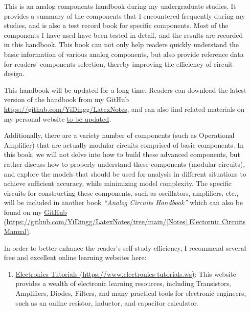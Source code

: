 \documentclass[UTF8]{report}
\begin{document}
\newpage
\begin{enabstract}
    This is an analog components handbook during my undergraduate studies. It provides a summary of the components that I encountered frequently during my studies, and is also a test record book for specific components. Most of the components I have used have been tested in detail, and the results are recorded in this handbook. This book can not only help readers quickly understand the basic information of various analog components, but also provide reference data for readers' components selection, thereby improving the efficiency of circuit design.

    This handbook will be updated for a long time. Readers can download the latest version of the handbook from my GitHub \href{https://github.com/YiDingg/LatexNotes}{https://github.com/YiDingg/LatexNotes}, and can also find related materials on my personal website \href{URL}{to be updated}.

    

    Additionally, there are a variety number of components (such as Operational Amplifier) that are actually modular circuits comprised of basic components. In this book, we will not delve into how to build these advanced components, but rather discuss how to properly understand these components (modular circuits), and explore the models that should be used for analysis in different situations to achieve sufficient accuracy, while minimizing model complexity. The specific circuits for constructing these components, such as oscillators, amplifiers, etc., will be included in another book \textit{``Analog Circuits Handbook''} which can also be found on my \href{https://github.com/YiDingg/LatexNotes/tree/main/%5BNotes%5D%20Electornic%20Circuits%20Manual}{GitHub {\color{black} (https://github.com/YiDingg/LatexNotes/tree/main/[Notes] Electornic Circuits Manual)}}. 
    
    In order to better enhance the reader's self-study efficiency, I recommend several free and excellent online learning websites here: 
    \begin{enumerate}
    \item \href{https://www.electronics-tutorials.ws}{Electronics Tutorials {\color{black} (https://www.electronics-tutorials.ws)}}: This website provides a wealth of electronic learning resources, including Transistors, Amplifiers, Diodes, Filters, and many practical tools for electronic engineers, such as an online resistor, inductor, and capacitor calculator.
    

\end{enumerate}
\end{enabstract}
\end{document}
